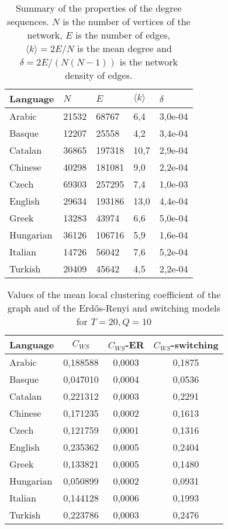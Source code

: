 \documentclass[paper=a4, fontsize=11pt]{scrartcl} %
\begin{document}
\begin{table}[htbp]
\centering
\caption{Summary of the properties of the degree sequences. $N$ is the number of vertices of the network, $E$ is the number of edges, $\langle k\rangle=2E/N$ is the mean degree and $\delta=2E/(N(N-1))$ is the network density of edges.}
\label{table1}
\begin{tabular}{l|llll}
Language	& $N$		& $E$		& $\langle k\rangle$	& $\delta$ \\ \hline
Arabic 	& 21532	&  68767 	&  6,4 			& 3,0e-04 \\ 
Basque  	& 12207 	& 25558   	& 4,2  			& 3,4e-04 \\
Catalan  	& 36865 	& 197318 	& 10,7 			& 2,9e-04 \\
Chinese 	&40298 	& 181081 	&  9,0 			& 2,2e-04 \\
Czech 	& 69303	& 257295 	& 7,4 				& 1,0e-03 \\
English 	& 29634 	& 193186  	& 13,0 			& 4,4e-04 \\
Greek  	& 13283  	& 43974  	&  6,6  			& 5,0e-04 \\
Hungarian  	& 36126 	& 106716  	& 5,9  			& 1,6e-04 \\
Italian  	& 14726  	& 56042   	& 7,6  			& 5,2e-04 \\
Turkish  	& 20409  	& 45642  	& 4,5 				& 2,2e-04
\end{tabular}
\end{table}

\begin{table}
\centering
\caption{Values of the mean local clustering coefficient of the graph and of the Erd\H{o}s-Renyi and switching models for $T=20,Q=10$}
\label{mlcValues}
\begin{tabular}{lccc}
Language		& $C_{WS}$		& $C_{WS}$-ER 	& $C_{WS}$-switching \\ \hline
Arabic &  0,188588  &  0,0003  &  0,1875\\
Basque &  0,047010  &  0,0004  &  0,0536\\
Catalan &  0,221312  &  0,0003  &  0,2291\\
Chinese &  0,171235  &  0,0002  &  0,1613\\
Czech &  0,121759  &  0,0001  &  0,1316\\
English &  0,235362  &  0,0005  &  0,2404\\
Greek &  0,133821  &  0,0005  &  0,1480\\
Hungarian &  0,050899  &  0,0002  &  0,0931\\
Italian &  0,144128  &  0,0006  &  0,1993\\
Turkish &  0,223786  &  0,0003  &  0,2476\\
\end{tabular}
\end{table}
\end{document}
